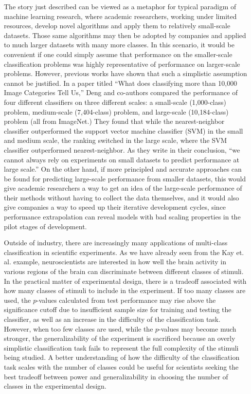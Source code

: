 \documentclass[12pt]{article}
\begin{document}
The story just described can be viewed as a metaphor for typical
paradigm of machine learning research, where academic researchers,
working under limited resources, develop novel algorithms and apply
them to relatively small-scale datasets.  Those same algorithms may
then be adopted by companies and applied to much larger datasets with
many more classes.  In this scenario, it would be convenient if one
could simply assume that performance on the smaller-scale
classification problems was highly representative of performance on
larger-scale problems.  However, previous works have shown that such a
simplistic assumption cannot be justified.  In a paper titled ``What
does classifying more than 10,000 Image Categories Tell Us,'' Deng and
co-authors compared the performance of four different classifiers on
three different scales: a small-scale (1,000-class) problem,
medium-scale (7,404-class) problem, and large-scale (10,184-class)
problem (all from ImageNet.)  They found that while the
nearest-neighbor classifier outperformed the support vector machine
classifier (SVM) in the small and medium scale, the ranking switched
in the large scale, where the SVM classifier outperformed
nearest-neighbor.  As they write in their conclusion, ``we cannot
always rely on experiments on small datasets to predict performance at
large scale.''  On the other hand, if more principled and accurate
approaches can be found for predicting large-scale performance from
smaller datasets, this would give academic researchers a way to get an
idea of the large-scale performance of their methods without having to
collect the data themselves, and it would also give companies a way to
speed up their iterative development cycles, since performance
extrapolation can reveal models with bad scaling properties in the
pilot stages of development.

Outside of industry, there are increasingly many applications of
multi-class classification in scientific experiments.  As we have
already seen from the Kay et. al. example, neuroscientists are
interested in how well the brain activity in various regions of the
brain can discriminate between different classes of stimuli.  In the
practical matter of experimental design, there is a tradeoff
associated with how many classes of stimuli to include in the
experiment.  If too many classes are used, the $p$-values calculated
from test performance may rise above the significance cutoff due to
insufficient sample size for training and testing the classifier, as
well as an increase in the difficulty of the classification task.
However, when too few classes are used, while the $p$-values may
become much stronger, the generalizability of the experiment is
sacrificed because an overly simplistic classification task fails to
represent the full complexity of the stimuli being studied.  A better
understanding of how the difficulty of the classification task scales
with the number of classes could be useful for scientists seeking the
best tradeoff between power and generalizability in choosing the
number of classes in the experimental design.
\end{document}
